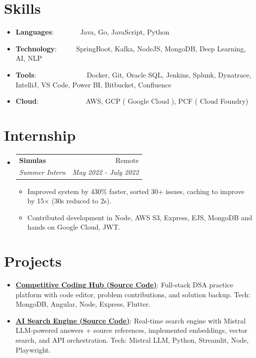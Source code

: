 \documentclass[a4paper,10pt]{article}
\makeatletter
\newcommand{\resumeItem}[2]{
  \item\small{
    \textbf{#1}{: #2 \vspace{-2pt}}
  }
}
\newcommand{\resumeSubheadingFull}[4]{
  \vspace{-1pt}\item
    \begin{tabular*}{0.97\textwidth}{l@{\extracolsep{\fill}}r}
    \textbf{#1} & #2 \\
    \textit{#3} & \textit{#4} \\
    \end{tabular*}\vspace{-5pt}
}
\newcommand{\resumeSubItem}[2]{\resumeItem{#1}{#2}\vspace{-3pt}}
\newcommand{\resumeSubHeadingListStart}{\begin{itemize}[leftmargin=*]}
\newcommand{\resumeSubHeadingListEnd}{\end{itemize}}
\newcommand{\resumeItemListStart}{\begin{itemize}}
\newcommand{\resumeItemListEnd}{\end{itemize}\vspace{-5pt}}
\makeatother
\begin{document}
\section{Skills}
	\resumeSubHeadingListStart
	\resumeSubItem{Languages}{~~~~~~~Java, Go, JavaScript, Python}
	\resumeSubItem{Technology}{~~~~~SpringBoot, Kafka, NodeJS, MongoDB, Deep Learning, AI, NLP}
	\resumeSubItem{Tools}{~~~~~~~~~~~~~~Docker, Git, Oracle SQL, Jenkins, Splunk, Dynatrace, IntelliJ, VS Code, Power BI, Bitbucket, Confluence}
	\resumeSubItem{Cloud}{~~~~~~~~~~~~~AWS, GCP ( Google Cloud ), PCF ( Cloud Foundry) }
\vspace{4pt}    
\resumeSubHeadingListEnd

\section{Internship}
  \resumeSubHeadingListStart
    \resumeSubheadingFull{Simulas}{Remote}
		{Summer Intern}{May 2022 - July 2022}
		\resumeItemListStart
        \item Improved system by 430\% faster, sorted 30+ issues, caching to improve by 15× (30s reduced to 2s).
        \item Contributed development in Node, AWS S3, Express, EJS, MongoDB and hands on Google Cloud, JWT.	
		\resumeItemListEnd
\vspace{2pt}
\resumeSubHeadingListEnd

\section{Projects}
\resumeSubHeadingListStart
\resumeSubItem{\href{https://github.com/om-ashish-soni/competitive-coding-hub}
{Competitive Coding Hub (Source Code)}} {Full-stack DSA practice platform with code editor, problem contributions, and solution backup. Tech: MongoDB, Angular, Node, Express, Flutter.}
\vspace{2pt}
\resumeSubItem{\href{https://github.com/om-ashish-soni/ai_search_engine}
{AI Search Engine (Source Code)}} {Real-time search engine with Mistral LLM-powered answers + source references, implemented embeddings, vector search, and API orchestration. Tech: Mistral LLM, Python, Streamlit, Node, Playwright.}
\vspace{4pt}
\resumeSubHeadingListEnd

\end{document}
